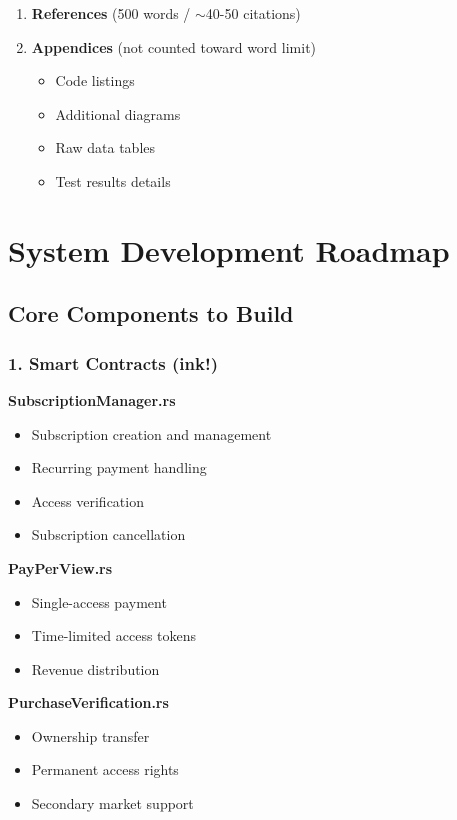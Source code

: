 \documentclass[12pt,a4paper]{article}
\begin{document}
\begin{enumerate}
    \item \textbf{References} (500 words / $\sim$40-50 citations)
    
    \item \textbf{Appendices} (not counted toward word limit)
    \begin{itemize}[label=--]
        \item Code listings
        \item Additional diagrams
        \item Raw data tables
        \item Test results details
    \end{itemize}
\end{enumerate}

\section{System Development Roadmap}

\subsection{Core Components to Build}

\subsubsection*{1. Smart Contracts (ink!)}

\textbf{SubscriptionManager.rs}
\begin{itemize}
    \item Subscription creation and management
    \item Recurring payment handling
    \item Access verification
    \item Subscription cancellation
\end{itemize}

\textbf{PayPerView.rs}
\begin{itemize}
    \item Single-access payment
    \item Time-limited access tokens
    \item Revenue distribution
\end{itemize}

\textbf{PurchaseVerification.rs}
\begin{itemize}
    \item Ownership transfer
    \item Permanent access rights
    \item Secondary market support
\end{itemize}
\end{document}
